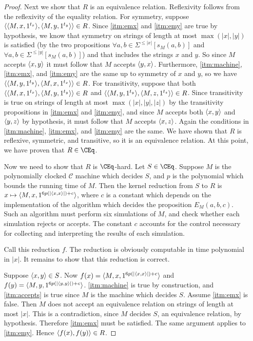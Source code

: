 \begin{proof}
  Next we show that $R$ is an equivalence relation.
  Reflexivity follows from the reflexivity of the equality relation.
  For symmetry, suppose $\langle\langle M,x,1^{t_x}\rangle,\langle M,y,1^{t_y}\rangle\rangle\in R$.
  Since \autoref{itm:emx} and \autoref{itm:emy} are true by hypothesis, we know that symmetry on strings of length at most $\max(|x|, |y|)$ is satisfied (by the two propositions $\forall a,b\in\Sigma^{\leq |x|} [s_M(a, b)]$ and $\forall a,b\in\Sigma^{\leq |y|} [s_M(a, b)]$) and that includes the strings $x$ and $y$.
  So since $M$ accepts $\langle x,y\rangle$ it must follow that $M$ accepts $\langle y,x\rangle$.
  Furthermore, \autoref{itm:machine}, \autoref{itm:emx}, and \autoref{itm:emy} are the same up to symmetry of $x$ and $y$, so we have $\langle\langle M,y,1^{t_y}\rangle,\langle M,x,1^{t_x}\rangle\rangle\in R$.
  For transitivity, suppose that both $\langle\langle M,x,1^{t_x}\rangle,\langle M,y,1^{t_y}\rangle\rangle\in R$ and $\langle\langle M,y,1^{t_y}\rangle,\langle M,z,1^{t_z}\rangle\rangle\in R$.
  Since transitivity is true on strings of length at most $\max(|x|, |y|, |z|)$ by the transitivity propositions in \autoref{itm:emx} and \autoref{itm:emy}, and since $M$ accepts both $\langle x,y\rangle$ and $\langle y,z\rangle$ by hypothesis, it must follow that $M$ accepts $\langle x,z\rangle$.
  Again the conditions in \autoref{itm:machine}, \autoref{itm:emx}, and \autoref{itm:emy} are the same.
  We have shown that $R$ is reflexive, symmetric, and transitive, so it is an equivalence relation.
  At this point, we have proven that $R\in\CEq$.

  Now we need to show that $R$ is $\CEq$-hard.
  Let $S\in\CEq$.
  Suppose $M$ is the polynomially clocked $\mathcal{C}$ machine which decides $S$, and $p$ is the polynomial which bounds the running time of $M$.
  Then the kernel reduction from $S$ to $R$ is $x\mapsto\langle M,x,1^{6p(|\langle x,x\rangle|)+c}\rangle$, where $c$ is a constant which depends on the implementation of the algorithm which decides the proposition $E_M(a, b, c)$.
  Such an algorithm must perform six simulations of $M$, and check whether each simulation rejects or accepts.
  The constant $c$ accounts for the control necessary for collecting and interpreting the results of each simulation.

  Call this reduction $f$.
  The reduction is obviously computable in time polynomial in $|x|$.
  It remains to show that this reduction is correct.

  Suppose $\langle x,y\rangle\in S$.
  Now $f(x)=\langle M,x,1^{6p(|\langle x,x\rangle|)+c}\rangle$ and $f(y)=\langle M,y,1^{6p(|\langle y,y\rangle|)+c}\rangle$.
  \autoref{itm:machine} is true by construction, and \autoref{itm:accepts} is true since $M$ is the machine which decides $S$.
  Assume \autoref{itm:emx} is false.
  Then $M$ does not accept an equivalence relation on strings of length at most $|x|$.
  This is a contradiction, since $M$ decides $S$, an equivalence relation, by hypothesis.
  Therefore \autoref{itm:emx} must be satisfied.
  The same argument applies to \autoref{itm:emy}.
  Hence $\langle f(x),f(y)\rangle\in R$.


\end{proof}

